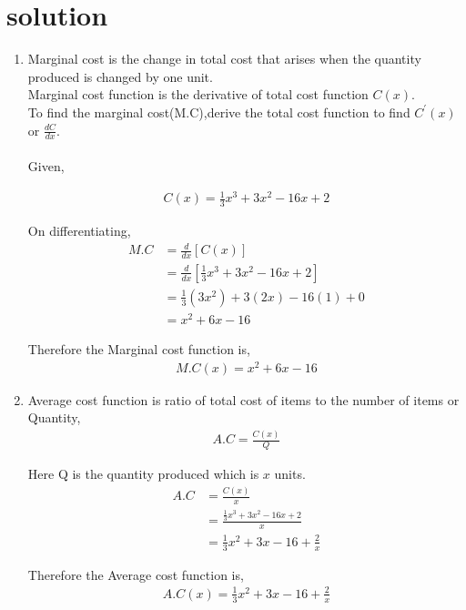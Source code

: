 \documentclass[article,12pt,twocolumn]{IEEEtran}
\begin{document}
  \section*{solution}
     \begin{enumerate}[ label=(\roman*)]
    \item Marginal cost is the change in total cost that arises
     when the quantity produced is changed by one unit. \\
     Marginal cost function is the derivative of total cost    
     function $C(x)$.\\
      To find the marginal cost(M.C),derive the total cost function 
      to find $C^{\prime}(x)$ or $\frac{dC}{dx}$. \\\\
      Given,
      
          \begin{align}
            C(x) = \frac{1}{3}x^3 + 3x^2 - 16x +2
          \end{align}
          
      On differentiating,
          \begin{align}
            M.C &= \frac{d}{dx} [C(x)]
            \\
            &= \frac{d}{dx} [\frac{1}{3}x^3 + 3x^2 - 16x +2] 
            \\
            &= \frac{1}{3}(3x^2) + 3(2x)-16(1)+0 
            \\
            &= x^2+6x-16
          \end{align}  
          
      Therefore the Marginal cost function is,
          \begin{align*}
            M.C(x)=x^2+6x-16
          \end{align*}        
      
    \item Average cost function is ratio of total cost of items to the
     number of items or Quantity,
         \begin{align}
           A.C=\frac{C(x)}{Q}
         \end{align}
         
    Here Q is the quantity produced which is $x$ units.
        \begin{align}
          A.C &=\frac{C(x)}{x} 
          \\
          &=\frac{\frac{1}{3}x^3 + 3x^2 - 16x +2}{x} 
          \\
          &=\frac{1}{3}x^2 + 3x - 16 +\frac{2}{x}
        \end{align}    
               
    Therefore the Average cost function is,
         \begin{align*}
           A.C(x)=\frac{1}{3}x^2 + 3x - 16 +\frac{2}{x}
         \end{align*}
         
   \end{enumerate}
   
\end{document}
